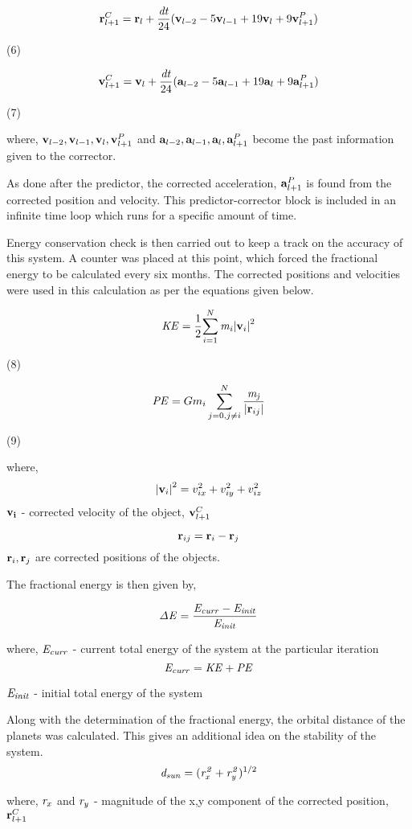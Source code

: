 \documentclass[11pt]{article}
\begin{document}
{{\bigskip

\[ {\bf r}_{l+1}^C = {\bf r}_l + \frac{{\it dt}} {24} ({\bf v}_{l-2} - 5{\bf v}_{l-1} + 19{\bf v}_l + 9{\bf v}_{l+1}^P) \]
\begin{flushright} (6) \end{flushright}

\[ {\bf v}_{l+1}^C = {\bf v}_l + \frac{{\it dt}} {24} ({\bf a}_{l-2} - 5{\bf a}_{l-1} + 19{\bf a}_l + 9{\bf a}_{l+1}^P) \]
\begin{flushright} (7) \end{flushright}

\smallskip

where,
\smallskip
${\bf v}_{l-2}, {\bf v}_{l-1}, {\bf v}_l, {\bf v}_{l+1}^P$ and ${\bf a}_{l-2}, {\bf a}_{l-1}, {\bf a}_l, {\bf a}_{l+1}^P$ become the past information given to the corrector.

\medskip

As done after the predictor, the corrected acceleration, ${\bf a}_{l+1}^P$ is found from the corrected position and velocity. This predictor-corrector block is included in an infinite time loop which runs for a specific amount of time. 
\medskip

Energy conservation check is then carried out to keep a track on the accuracy of this system. A counter was placed at this point, which forced the fractional energy to be calculated every six months. The corrected positions and velocities were used in this calculation as per the equations given below.

\[ {\it KE} = \frac{1}{2} { \sum_{i=1}^N {\it m_i} {\left| {\bf v}_i\right|}^2} \] 
\begin{flushright} (8) \end{flushright}

\[ {\it PE} = Gm_i \sum_{j=0,j \neq i}^{N} \frac{\it m_j}{\left| {\bf r}_{ij} \right|} \]
\begin{flushright} (9) \end{flushright}

where,
\[ {\left| {\bf v}_i \right|}^2 = v_{ix}^2 + v_{iy}^2 + v_{iz}^2 \]
${\bf v_i}$ - corrected velocity of the object, ${\bf v}_{l+1}^C$

\[ {\bf r}_{ij} = {\bf r}_i - {\bf r}_j \]
${\bf r}_i, {\bf r}_j$ are corrected positions of the objects.

\smallskip
The fractional energy is then given by,

\[ {\it \Delta E} = \frac{\it {E_{curr} - E_{init}}} {\it E_{init}} \]

where,
$\it E_{curr}$ - current total energy of the system at the particular iteration
\[ {\it E_{curr}} = {\it KE} + {\it PE} \]

$\it E_{init}$ - initial total energy of the system
\medskip

Along with the determination of the fractional energy, the orbital distance of the planets was calculated. This gives an additional idea on the stability of the system. 
\[ {\it d_{sun}} = ({\it r_x^2} + {\it r_y^2})^{1/2} \]

where,
${\it r_x}$ and ${\it r_y}$ -  magnitude of the x,y component of the corrected position, ${{\bf r}_{l+1}^C}$
}}
\end{document}
